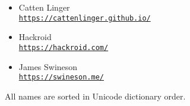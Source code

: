 


\newcommand{\sgitem}[2]{
    \noindent%
    \parbox[t][16mm][t]{\linewidth}{%
    \parskip=3pt
        \rmfamily\Large\mdseries\myvphantom#1\par
        \ttfamily\small\mdseries\myvphantom\href{#2}{#2}\par
    }\par
}
\newcommand{\sgitemalt}[2]{
    \item \textrm{\large#1}\nopagebreak\\\nopagebreak\texttt{\small\href{#2}{#2}}
}



\begin{itemize}
    \sgitemalt{Catten Linger}{https://cattenlinger.github.io/}
    \sgitemalt{Hackroid}{https://hackroid.com/}
    \sgitemalt{James Swineson}{https://swineson.me/}
\end{itemize}


\vskip 20mm\vfill\small\rmfamily
All names are sorted in Unicode dictionary order.




